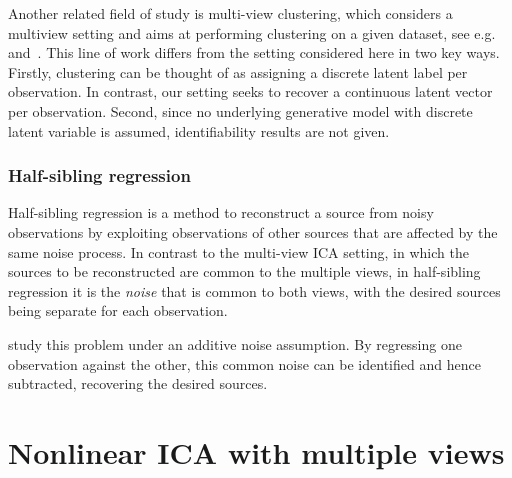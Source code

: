 Another related field of study is multi-view clustering, which considers a multiview setting and aims at performing clustering on a given dataset, see e.g.~\cite{de2005spectral} and~\cite{kumar2011co}. This line of work differs from the setting considered here in two key ways.
Firstly, clustering can be thought of as assigning a discrete latent label per observation. In contrast, our setting seeks to recover a continuous latent vector per observation.
Second, since no underlying generative model with discrete latent variable is assumed, identifiability results are not given.



\subsubsection{Half-sibling regression}
\label{sec:hsr}
Half-sibling regression \citep{scholkopf2016modeling} is a method to reconstruct a source from noisy observations by exploiting observations of other sources that are affected by the same noise process.
In contrast to the multi-view ICA setting, in which the sources to be reconstructed are common to the multiple views, in half-sibling regression it is the \emph{noise} that is common to both views, with the desired sources being separate for each observation.

\cite{scholkopf2016modeling} study this problem under an additive noise assumption. 
By regressing one observation against the other, this common noise can be identified and hence subtracted, recovering the desired sources.

%

\section{Nonlinear ICA with multiple views}\label{sec:ica-nonlinear-ica-with-mulitple-views}


